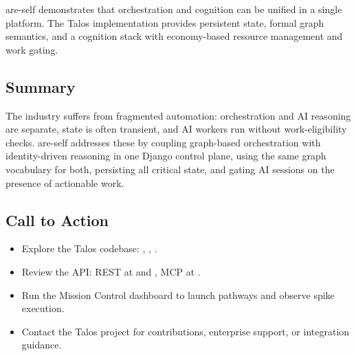\documentclass[11pt]{article}
\begin{document}
	are-self demonstrates that orchestration and cognition can be unified in a single platform. The Talos implementation provides persistent state, formal graph semantics, and a cognition stack with economy-based resource management and work gating.

	\subsection{Summary}
	The industry suffers from fragmented automation: orchestration and AI reasoning are separate, state is often transient, and AI workers run without work-eligibility checks. are-self addresses these by coupling graph-based orchestration with identity-driven reasoning in one Django control plane, using the same graph vocabulary for both, persisting all critical state, and gating AI sessions on the presence of actionable work.

	\subsection{Call to Action}
	\begin{itemize}
		\item Explore the Talos codebase: , , .
		\item Review the API: REST at  and , MCP at .
		\item Run the Mission Control dashboard to launch pathways and observe spike execution.
		\item Contact the Talos project for contributions, enterprise support, or integration guidance.
	\end{itemize}
\end{document}
